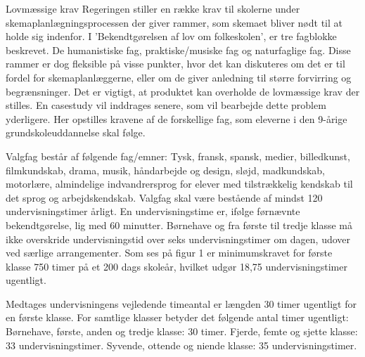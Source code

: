 Lovmæssige krav
Regeringen stiller en række krav til skolerne under skemaplanlægningsprocessen der giver rammer, som skemaet bliver nødt til at holde sig indenfor. I 'Bekendtgørelsen af lov om folkeskolen', er tre fagblokke beskrevet. De humanistiske fag, praktiske/musiske fag og naturfaglige fag. Disse rammer er dog fleksible på visse punkter, hvor det kan diskuteres om det er til fordel for skemaplanlæggerne, eller om de giver anledning til større forvirring og begrænsninger. Det er vigtigt, at produktet kan overholde de lovmæssige krav der stilles. En casestudy vil inddrages senere, som vil bearbejde dette problem yderligere. Her opstilles kravene af de forskellige fag, som eleverne i den 9-årige grundskoleuddannelse skal følge.\cite{lov2016}

 Valgfag består af følgende fag/emner: Tysk, fransk, spansk, medier, billedkunst, filmkundskab, drama, musik, håndarbejde og design, sløjd, madkundskab, motorlære, almindelige indvandrersprog for elever med tilstrækkelig kendskab til det sprog og arbejdskendskab.
Valgfag skal være bestående af mindst 120 undervisningstimer årligt.\cite{lov2016}
En undervisningstime er, ifølge førnævnte bekendtgørelse, lig med 60 minutter. Børnehave og fra første til tredje klasse må ikke overskride undervisningstid over seks undervisningstimer om dagen, udover ved særlige arrangementer.
Som ses på figur 1 er minimumskravet for første klasse 750 timer på et 200 dags skoleår, hvilket udgør 18,75 undervisningstimer ugentligt. \cite{timeskema2016}

Medtages undervisningens vejledende timeantal er længden 30 timer ugentligt for en første klasse. For samtlige klasser betyder det følgende antal timer ugentligt:
Børnehave, første, anden og tredje klasse: 30 timer.
Fjerde, femte og sjette klasse: 33 undervisningstimer.
Syvende, ottende og niende klasse: 35 undervisningstimer.

